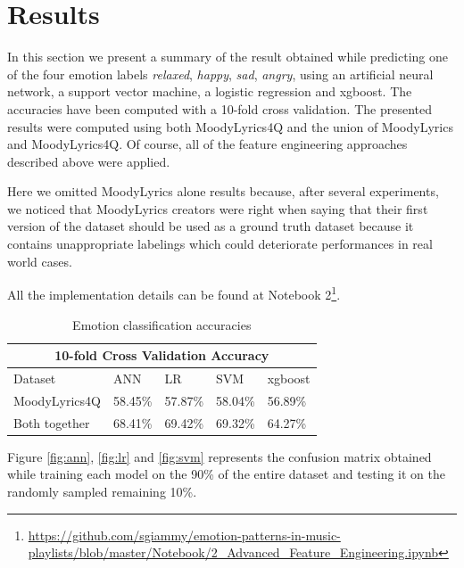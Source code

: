 \section{Results}
In this section we present a summary of the result obtained while predicting one of the four emotion labels \textit{relaxed}, \textit{happy}, \textit{sad}, \textit{angry}, using an artificial neural network, a support vector machine, a logistic regression and xgboost. The accuracies have been computed with a 10-fold cross validation. The presented results were computed using both MoodyLyrics4Q and the union of MoodyLyrics and MoodyLyrics4Q. Of course, all of the feature engineering approaches described above were applied.

Here we omitted MoodyLyrics alone results because, after several experiments, we noticed that MoodyLyrics creators were right when saying that their first version of the dataset should be used as a ground truth dataset because it contains unappropriate labelings which could deteriorate performances in real world cases.

All the implementation details can be found at Notebook 2\footnote{\url{https://github.com/sgiammy/emotion-patterns-in-music-playlists/blob/master/Notebook/2_Advanced_Feature_Engineering.ipynb}}.

\begin{table}[H]
\centering
\begin{tabular}{ |p{3cm}||p{1.5cm}|p{1.5cm}|p{1.5cm}|p{1.5cm}|  }
 \hline
 \multicolumn{5}{|c|}{10-fold Cross Validation Accuracy} \\
 \hline
 Dataset & ANN & LR &SVM & xgboost\\
 \hline
MoodyLyrics4Q  & 58.45\%    &57.87\% &  58.04\% & 56.89\%\\
Both together &   68.41\%  & 69.42\%   &69.32\% &64.27\%\\
\hline
\end{tabular}
\caption{Emotion classification accuracies} \label{tab:comparison}
\end{table}

Figure \ref{fig:ann}, \ref{fig:lr} and \ref{fig:svm} represents the confusion matrix obtained while training each model on the 90\% of the entire dataset and testing it on the randomly sampled remaining 10\%.

